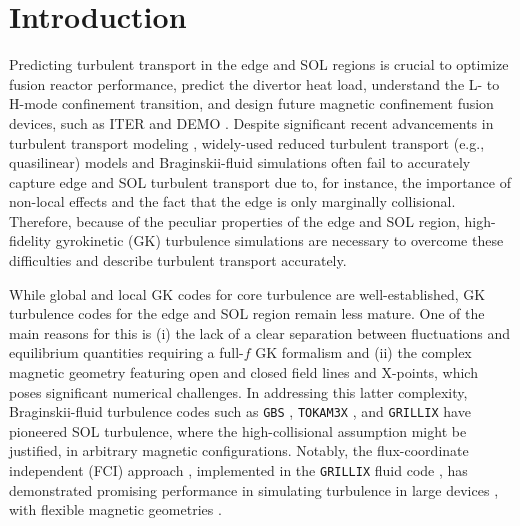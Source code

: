\documentclass[preprint,12pt]{elsarticle}
\begin{document}


\section{Introduction}

Predicting turbulent transport in the edge and SOL regions is crucial to optimize fusion reactor performance, predict the divertor heat load, understand the L- to H-mode confinement transition, and design future magnetic confinement fusion devices, such as ITER \cite{ikeda2007} and DEMO \cite{zohm2013}. Despite significant recent advancements in turbulent transport modeling \cite{litaudon2022}, widely-used reduced turbulent transport (e.g., quasilinear) models and Braginskii-fluid simulations often fail to accurately capture edge and SOL turbulent transport due to, for instance, the importance of non-local effects and the fact that the edge is only marginally collisional. Therefore, because of the peculiar properties of the edge and SOL region, high-fidelity gyrokinetic (GK) turbulence simulations are necessary to overcome these difficulties and describe turbulent transport accurately. 

While global \cite{goerler2011,grandgirard2016,lanti2020} and local \cite{jenko2000,candy2016,peeters2009} GK codes for core turbulence are well-established, GK turbulence codes for the edge and SOL region remain less mature. One of the main reasons for this is (i) the lack of a clear separation between fluctuations and equilibrium quantities requiring a full-$f$ GK formalism and (ii) the complex magnetic geometry featuring open and closed field lines and X-points, which poses significant numerical challenges. In addressing this latter complexity, Braginskii-fluid turbulence codes such as \verb|GBS| \cite{giacomin2021}, \verb|TOKAM3X| \cite{tamain2016},  and \verb|GRILLIX| \cite{stegmeir2019} have pioneered SOL turbulence, where the high-collisional assumption might be justified, in arbitrary magnetic configurations. Notably, the flux-coordinate independent (FCI) approach \cite{hariri2013,stegmeir2016}, implemented in the \verb|GRILLIX| fluid code \cite{stegmeir2019, zholobenko2021}, has demonstrated promising performance in simulating turbulence in large devices \cite{stegmeir2023}, with flexible magnetic geometries \cite{body2020}.
\end{document}
